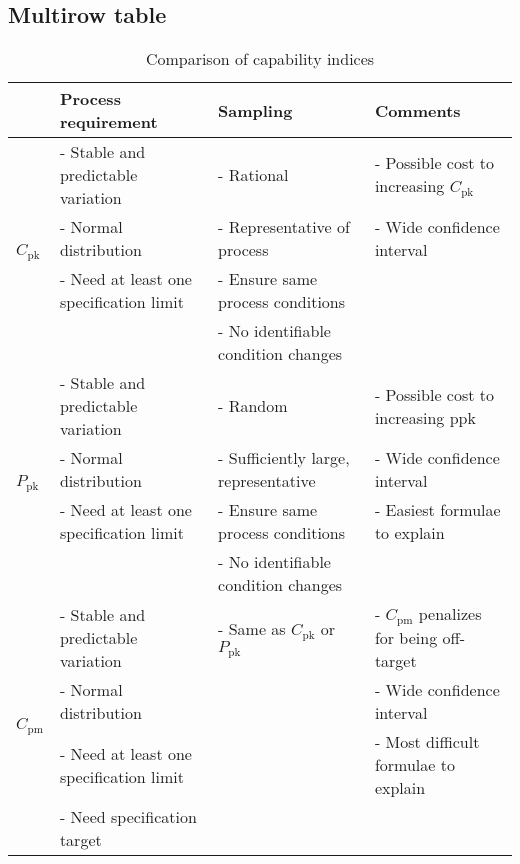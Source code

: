\documentclass[10pt, letterpaper, twoside]{article}
\begin{document}
\subsection{Multirow table}\label{sec:multirow_table}
\begin{table}[H]
\footnotesize
\centering
\begin{tabular}{llll}
\toprule
                                           & \textbf{Process requirement}            & \textbf{Sampling}                        & \textbf{Comments} \\
\midrule
\multirow[t]{4}{*}{$C_\text{pk}$}          & - Stable and predictable variation      & - Rational                               & - Possible cost to increasing $C_\text{pk}$ \\
                                           & - Normal distribution                   & - Representative of process              & - Wide confidence interval \\
                                           & - Need at least one specification limit & - Ensure same process conditions         & \\
                                           &                                         & - No identifiable condition changes      & \\
\multirow[t]{4}{*}{$P_\text{pk}$}          & - Stable and predictable variation      & - Random                                 & - Possible cost to increasing ppk \\
                                           & - Normal distribution                   & - Sufficiently large, representative     & - Wide confidence interval \\
                                           & - Need at least one specification limit & - Ensure same process conditions         & - Easiest formulae to explain \\
                                           &                                         & - No identifiable condition changes      & \\
\multirow[t]{4}{*}{$C_\text{pm}$}          & - Stable and predictable variation      & - Same as $C_\text{pk}$ or $P_\text{pk}$ & - $C_\text{pm}$ penalizes for being off-target \\
                                           & - Normal distribution                   &                                          & - Wide confidence interval \\
                                           & - Need at least one specification limit &                                          & - Most difficult formulae to explain \\
                                           & - Need specification target             &                                          & \\
\bottomrule
\end{tabular}
\caption{Comparison of capability indices}
\label{tab:comparison_capability_indices}
\end{table}
\end{document}
